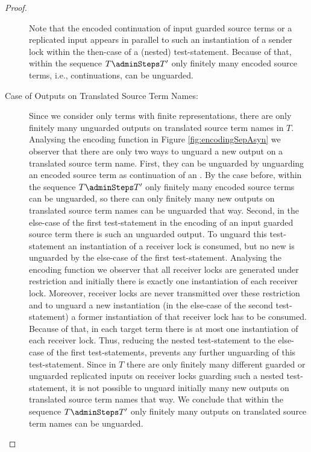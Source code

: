 \documentclass[]{llncs}
\begin{document}
\begin{proof}
\begin{description}
			Note that the encoded continuation of input guarded source terms or a replicated input appears in parallel to such an instantiation of a sender lock within the then-case of a (nested) test-statement. Because of that, within the sequence $ T \adminSteps T' $ only finitely many encoded source terms, i.e., continuations, can be unguarded.
		\item[Case of Outputs on Translated Source Term Names:] Since we consider only terms with finite representations, there are only finitely many unguarded outputs on translated source term names in $ T $. Analysing the encoding function in Figure \ref{fig:encodingSepAsyn} we observer that there are only two ways to unguard a new output on a translated source term name. First, they can be unguarded by unguarding an encoded source term as continuation of an \simulation. By the case before, within the sequence $ T \adminSteps T' $ only finitely many encoded source terms can be unguarded, so there can only finitely many new outputs on translated source term names can be unguarded that way. Second, in the else-case of the first test-statement in the encoding of an input guarded source term there is such an unguarded output. To unguard this test-statement an instantiation of a receiver lock is consumed, but no new is unguarded by the else-case of the first test-statement. Analysing the encoding function we observer that all receiver locks are generated under restriction and initially there is exactly one instantiation of each receiver lock. Moreover, receiver locks are never transmitted over these restriction and to unguard a new instantiation (in the else-case of the second test-statement) a former instantiation of that receiver lock has to be consumed. Because of that, in each target term there is at most one instantiation of each receiver lock. Thus, reducing the nested test-statement to the else-case of the first test-statements, prevents any further unguarding of this test-statement. Since in $ T $ there are only finitely many different guarded or unguarded replicated inputs on receiver locks guarding such a nested test-statement, it is not possible to unguard initially many new outputs on translated source term names that way. We conclude that within the sequence $ T \adminSteps T' $ only finitely many outputs on translated source term names can be unguarded.

\end{description}
\end{proof}
\end{document}
